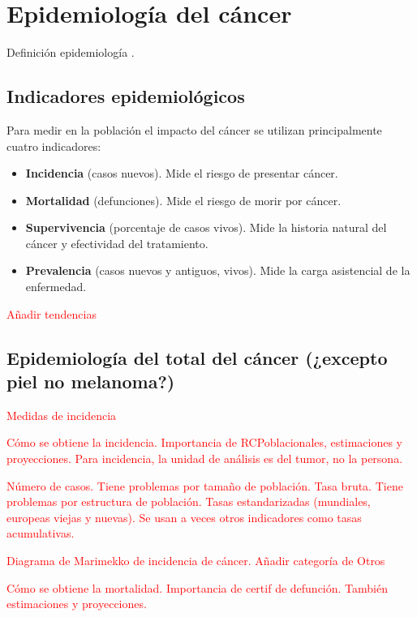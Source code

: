 \chapter{Epidemiología del cáncer}

Definición epidemiología \cite{IARC1999}.

\section{Indicadores epidemiológicos}

Para medir en la población el impacto del cáncer se utilizan principalmente cuatro indicadores:

\begin{itemize}
	\item \textbf{Incidencia} (casos nuevos). Mide el riesgo de presentar cáncer.
	\item \textbf{Mortalidad} (defunciones). Mide el riesgo de morir por cáncer.
	\item \textbf{Supervivencia} (porcentaje de casos vivos). Mide la historia natural del cáncer y efectividad del tratamiento.
	\item \textbf{Prevalencia} (casos nuevos y antiguos, vivos). Mide la carga asistencial de la enfermedad.
\end{itemize}

\textcolor{red}{Añadir tendencias}

\section{Epidemiología del total del cáncer (¿excepto piel no melanoma?)}

\textcolor{red}{Medidas de incidencia}

\textcolor{red}{Cómo se obtiene la incidencia. Importancia de RCPoblacionales, estimaciones y proyecciones. Para incidencia, la unidad de análisis es del tumor, no la persona.}

\textcolor{red}{Número de casos. Tiene problemas por tamaño de población. Tasa bruta. Tiene problemas por estructura de población. Tasas estandarizadas (mundiales, europeas viejas y nuevas). Se usan a veces otros indicadores como tasas acumulativas.}


\textcolor{red}{Diagrama de Marimekko de incidencia de cáncer. Añadir categoría de Otros}

\textcolor{red}{Cómo se obtiene la mortalidad. Importancia de certif de defunción. También estimaciones y proyecciones.}

